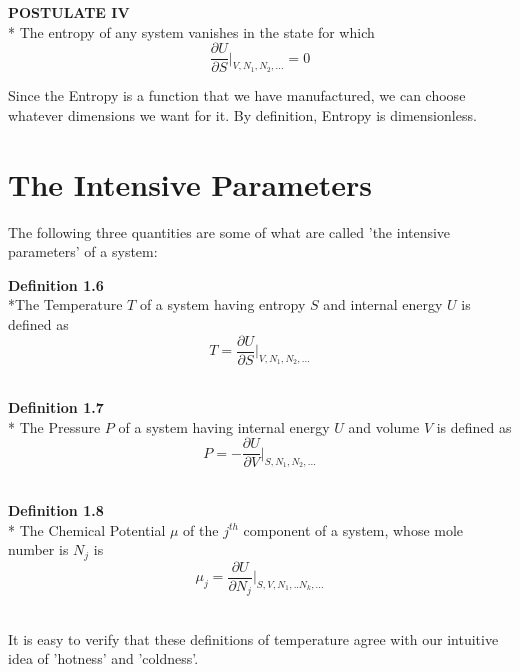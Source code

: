 \documentclass[oneside]{book}
\begin{document}
\begin{mdframed}[style=exercise]
\textbf{POSTULATE IV}
\\* The entropy of any system vanishes in the state for which \[ \frac{\partial U}{\partial S} \Bigg\rvert_{V,N_1,N_2,...} = 0\] 
\end{mdframed}

Since the Entropy is a function that we have manufactured, we can choose whatever dimensions we want for it. By definition, Entropy is dimensionless.\\

\section{The Intensive Parameters}

The following three quantities are some of what are called 'the intensive parameters' of a system:
\begin{mdframed}[style=exercise]
\textbf{Definition 1.6}
 \\*The Temperature $T$ of a system having entropy $S$ and internal energy $U$ is defined as
\[ T =\frac{\partial U}{\partial S}\Bigg\rvert_{V,N_1,N_2,...} \] \\ 
\end{mdframed}

\begin{mdframed}[style=exercise]
\textbf{Definition 1.7}
\\* The Pressure $P$ of a system having internal energy $U$ and volume $V$ is defined as
\[ P = -\frac{\partial U}{\partial V}\Bigg\rvert_{S,N_1,N_2,...} \]  \\ 
\end{mdframed}

\begin{mdframed}[style=exercise]
\textbf{Definition 1.8}
\\* The Chemical Potential $\mu$ of the $j^{th}$ component of a system, whose mole number is $N_j$ is
\[ \mu_j = \frac{\partial U}{\partial N_j }\Bigg\rvert_{S,V,N_1,..N_k,...} \]  \\ 
\end{mdframed}

It is easy to verify that these definitions of temperature agree with our intuitive idea of 'hotness' and 'coldness'.\\
\end{document}
